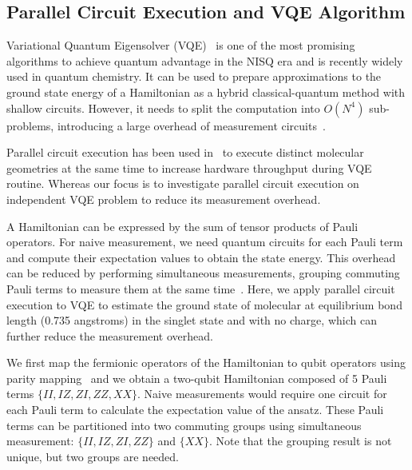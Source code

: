 \documentclass[conference]{IEEEtran}
\begin{document}
\subsection{Parallel Circuit Execution and VQE Algorithm}
Variational Quantum Eigensolver (VQE)~\cite{kandala2017hardware} is one of the most promising algorithms to achieve quantum advantage in the NISQ era and is recently widely used in quantum chemistry. It can be used to prepare approximations to the ground state energy of a Hamiltonian as a hybrid classical-quantum method with shallow circuits. However, it needs to split the computation into $O(N^4)$ sub-problems, introducing a large overhead of measurement circuits~\cite{gokhale2020optimization}. 

Parallel circuit execution has been used in~\cite{eddins2021doubling} to execute distinct molecular geometries at the same time to increase hardware throughput during VQE routine. Whereas our focus is to investigate parallel circuit execution on independent VQE problem to reduce its measurement overhead. 

A Hamiltonian can be expressed by the sum of tensor products of Pauli operators. For naive measurement, we need quantum circuits for each Pauli term and compute their expectation values to obtain the state energy. This overhead can be reduced by performing simultaneous measurements, grouping commuting Pauli terms to measure them at the same time~\cite{mcclean2016theory, gokhale2020optimization}. Here, we apply parallel circuit execution to VQE to estimate the ground state of molecular  at equilibrium bond length (0.735 angstroms) in the singlet state and with no charge, which can further reduce the measurement overhead. 

We first map the fermionic operators of the Hamiltonian to qubit operators using parity mapping~\cite{bravyi2017tapering} and we obtain a two-qubit Hamiltonian composed of 5 Pauli terms $\{II, IZ, ZI, ZZ, XX\}$. Naive measurements would require one circuit for each Pauli term to calculate the expectation value of the ansatz. These Pauli terms can be partitioned into two commuting groups using simultaneous measurement: $\{II, IZ, ZI, ZZ\}$ and $\{XX\}$. Note that the grouping result is not unique, but two groups are needed.  
\end{document}
